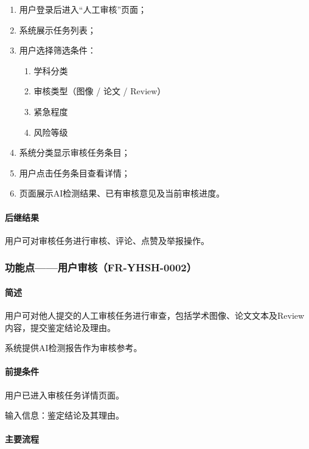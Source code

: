 \begin{enumerate}
    \item 用户登录后进入“人工审核”页面；
    \item 系统展示任务列表；
    \item 用户选择筛选条件：
    \begin{enumerate}
        \item 学科分类
        \item 审核类型（图像 / 论文 / Review）
        \item 紧急程度
        \item 风险等级
    \end{enumerate}
    \item 系统分类显示审核任务条目；
    \item 用户点击任务条目查看详情；
    \item 页面展示AI检测结果、已有审核意见及当前审核进度。
\end{enumerate}

\paragraph*{后继结果}

用户可对审核任务进行审核、评论、点赞及举报操作。

\subsubsection{功能点——用户审核（FR-YHSH-0002）}

\paragraph*{简述}

用户可对他人提交的人工审核任务进行审查，包括学术图像、论文文本及Review内容，提交鉴定结论及理由。

系统提供AI检测报告作为审核参考。

\paragraph*{前提条件}

用户已进入审核任务详情页面。

输入信息：鉴定结论及其理由。

\paragraph*{主要流程}

